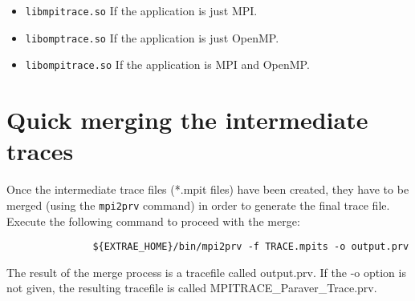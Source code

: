 \begin{itemize}
 \item {\tt libmpitrace.so} If the application is just MPI.
 \item {\tt libomptrace.so} If the application is just OpenMP.
 \item {\tt libompitrace.so} If the application is MPI and OpenMP.
\end{itemize}

\section{Quick merging the intermediate traces}

Once the intermediate trace files (*.mpit files) have been created, they have to be merged (using the {\tt mpi2prv} command) in order to generate the final \PARAVER trace file. Execute the following command to proceed with the merge:

\begin{verbatim}
               ${EXTRAE_HOME}/bin/mpi2prv -f TRACE.mpits -o output.prv
\end{verbatim}

The result of the merge process is a \PARAVER tracefile called output.prv. If the -o option is not given, the resulting tracefile is called MPITRACE\_Paraver\_Trace.prv. 
